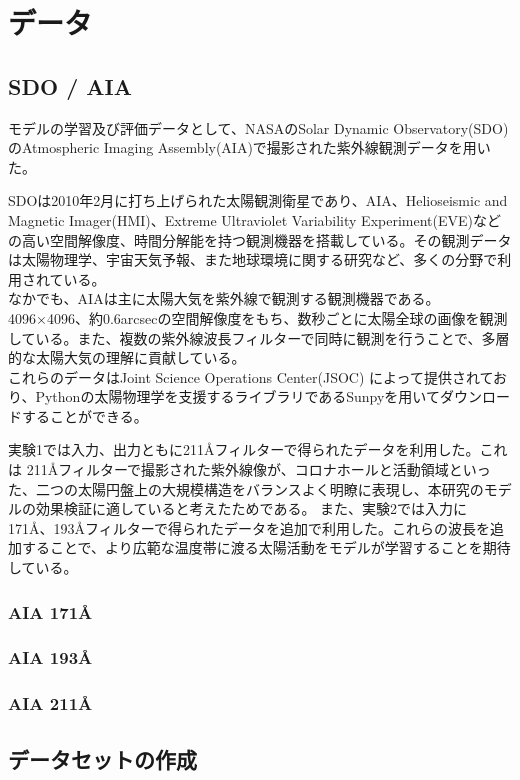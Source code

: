 \chapter{データ} 

\section{SDO / AIA}
モデルの学習及び評価データとして、NASAのSolar Dynamic Observatory(SDO)\cite{pesnell2012solar}のAtmospheric Imaging Assembly(AIA)で撮影された紫外線観測データを用いた。

SDOは2010年2月に打ち上げられた太陽観測衛星であり、AIA、Helioseismic and Magnetic Imager(HMI)、Extreme Ultraviolet Variability Experiment(EVE)などの高い空間解像度、時間分解能を持つ観測機器を搭載している。その観測データは太陽物理学、宇宙天気予報、また地球環境に関する研究など、多くの分野で利用されている。\\
なかでも、AIAは主に太陽大気を紫外線で観測する観測機器である。4096×4096、約0.6arcsecの空間解像度をもち、数秒ごとに太陽全球の画像を観測している。また、複数の紫外線波長フィルターで同時に観測を行うことで、多層的な太陽大気の理解に貢献している。\\
これらのデータはJoint Science Operations Center(JSOC) によって提供されており、Pythonの太陽物理学を支援するライブラリであるSunpyを用いてダウンロードすることができる。

実験1では入力、出力ともに211Åフィルターで得られたデータを利用した。これは 211Åフィルターで撮影された紫外線像が、コロナホールと活動領域といった、二つの太陽円盤上の大規模構造をバランスよく明瞭に表現し、本研究のモデルの効果検証に適していると考えたためである。
また、実験2では入力に171Å、193Åフィルターで得られたデータを追加で利用した。これらの波長を追加することで、より広範な温度帯に渡る太陽活動をモデルが学習することを期待している。

\subsection{AIA 171Å}
\subsection{AIA 193Å}
\subsection{AIA 211Å}


\section{データセットの作成}

